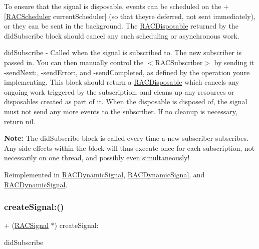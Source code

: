 To ensure that the signal is disposable, events can be scheduled on the +\mbox{[}\mbox{\hyperlink{interface_r_a_c_scheduler}{R\+A\+C\+Scheduler}} current\+Scheduler\mbox{]} (so that they\textquotesingle{}re deferred, not sent immediately), or they can be sent in the background. The \mbox{\hyperlink{interface_r_a_c_disposable}{R\+A\+C\+Disposable}} returned by the {\ttfamily did\+Subscribe} block should cancel any such scheduling or asynchronous work.

did\+Subscribe -\/ Called when the signal is subscribed to. The new subscriber is passed in. You can then manually control the $<$\+R\+A\+C\+Subscriber$>$ by sending it -\/send\+Next\+:, -\/send\+Error\+:, and -\/send\+Completed, as defined by the operation you\textquotesingle{}re implementing. This block should return a \mbox{\hyperlink{interface_r_a_c_disposable}{R\+A\+C\+Disposable}} which cancels any ongoing work triggered by the subscription, and cleans up any resources or disposables created as part of it. When the disposable is disposed of, the signal must not send any more events to the {\ttfamily subscriber}. If no cleanup is necessary, return nil.

{\bfseries Note\+:} The {\ttfamily did\+Subscribe} block is called every time a new subscriber subscribes. Any side effects within the block will thus execute once for each subscription, not necessarily on one thread, and possibly even simultaneously! 

Reimplemented in \mbox{\hyperlink{interface_r_a_c_dynamic_signal_aeffa754150754dd6296d5225b5c9c7fe}{R\+A\+C\+Dynamic\+Signal}}, \mbox{\hyperlink{interface_r_a_c_dynamic_signal_aeffa754150754dd6296d5225b5c9c7fe}{R\+A\+C\+Dynamic\+Signal}}, and \mbox{\hyperlink{interface_r_a_c_dynamic_signal_aeffa754150754dd6296d5225b5c9c7fe}{R\+A\+C\+Dynamic\+Signal}}.

\mbox{\label{interface_r_a_c_signal_a4ba374f148d6e2a0339c4f4202b4dc26}} 
\subsubsection{\texorpdfstring{create\+Signal\+:()}{createSignal:()}\hspace{0.1cm}{\footnotesize\ttfamily [2/3]}}
{\footnotesize\ttfamily + (\mbox{\hyperlink{interface_r_a_c_signal}{R\+A\+C\+Signal}} $\ast$) create\+Signal\+: \begin{DoxyParamCaption}\item[{(\mbox{\hyperlink{interface_r_a_c_disposable}{R\+A\+C\+Disposable}} $\ast$($^\wedge$)(id$<$\mbox{\hyperlink{interface_r_a_c_subscriber}{R\+A\+C\+Subscriber}}$>$ subscriber))}]{did\+Subscribe }\end{DoxyParamCaption}}


